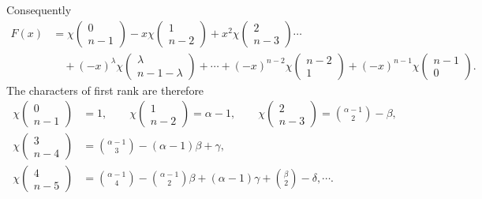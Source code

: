 \documentclass[11pt]{article}
\begin{document}
Consequently
\begin{equation}\tag{2.}
\begin{aligned}
 F(x)&=\chi\left(\begin{matrix}0\\ n-1\end{matrix}\right)
 -x\chi\left(\begin{matrix}1\\ n-2\end{matrix}\right)
 +x^2\chi\left(\begin{matrix}2\\ n-3\end{matrix}\right)\cdots\\
 &\quad+(-x)^\lambda\chi\left(\begin{matrix}\lambda\\ n-1-
\lambda\end{matrix}\right)+\cdots+(-x)^{n-2}\chi\left(\begin{matrix}n-2\\1\end{matrix}\right)+(-x)^{n-1}\chi\left(\begin{matrix}n-1\\0\end{matrix}\right).
\end{aligned}
\end{equation}
The characters of first rank are therefore
\begin{equation}\tag{3.}
\begin{aligned}
\chi\left(\begin{matrix}0\\ n-1\end{matrix}\right)&=1,\qquad
\chi\left(\begin{matrix}1\\ n-2\end{matrix}\right)=\alpha-1,
\qquad
\chi\left(\begin{matrix}2\\ n-3\end{matrix}\right)=\binom{\alpha-1}{2}-\beta,\\
\chi\left(\begin{matrix}3\\ n-4\end{matrix}\right)&=\binom{\alpha-1}{3}-(\alpha-1)\beta+
\gamma,\\
\chi\left(\begin{matrix}4\\ n-5\end{matrix}\right)&=\binom{\alpha-1}{4}-\binom{\alpha-1}{2}\beta+(
\alpha-1)\gamma+
\binom{\beta}{2}-\delta,
\cdots.
\end{aligned}
\end{equation}
\end{document}
